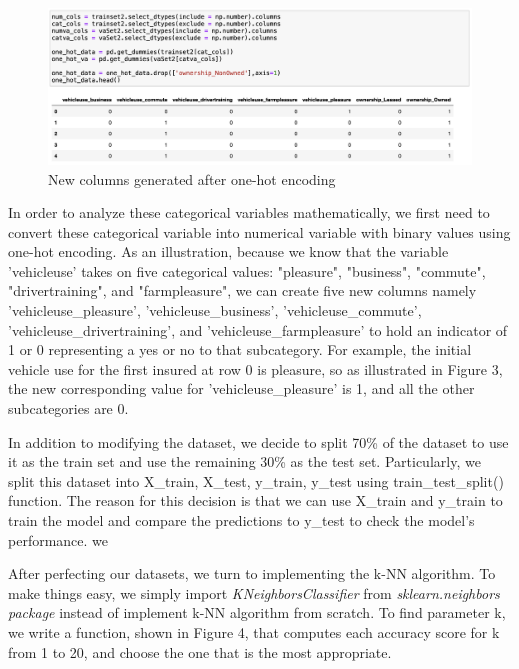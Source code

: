 \documentclass[12pt]{article} %
\theoremstyle{definition}
\begin{document}
\begin{figure}[h!]
    \centering
    \includegraphics[width=0.9\linewidth]{KNN/onehot.png}
    \caption{New columns generated after one-hot encoding}
\end{figure}

In order to analyze these categorical variables mathematically, we first need to convert these categorical variable into numerical variable with binary values using one-hot encoding. As an illustration, because we know that the variable 'vehicleuse' takes on five categorical values: "pleasure", "business", "commute", "drivertraining", and "farmpleasure", we can create five new columns namely 'vehicleuse\_pleasure', 'vehicleuse\_business', 'vehicleuse\_commute', 'vehicleuse\_drivertraining', and 'vehicleuse\_farmpleasure' to hold an indicator of 1 or 0 representing a yes or no to that subcategory. For example, the initial vehicle use for the first insured at row 0 is pleasure, so as illustrated in Figure 3, the new corresponding value for 'vehicleuse\_pleasure' is 1, and all the other subcategories are 0.

\vspace{\baselineskip}
In addition to modifying the dataset, we decide to split 70\% of the dataset to use it as the train set and use the remaining 30\% as the test set. Particularly, we split this dataset into X\_train, X\_test, y\_train, y\_test using train\_test\_split() function. The reason for this decision is that we can use X\_train and y\_train to train the model and compare the predictions to y\_test to check the model's performance. we 

\vspace{\baselineskip}
After perfecting our datasets, we turn to implementing the k-NN algorithm. To make things easy, we simply import \emph{KNeighborsClassifier} from \emph{sklearn.neighbors package} instead of implement k-NN algorithm from scratch. To find parameter k, we write a function, shown in Figure 4, that computes each accuracy score for k from 1 to 20, and choose the one that is the most appropriate.
\end{document}

